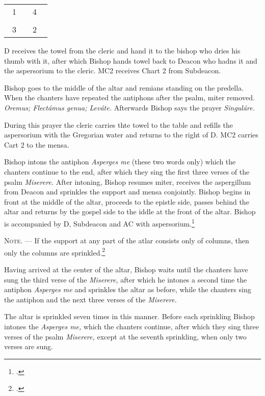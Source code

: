 \documentclass[letterpaper]{report}
\newcommand\crossplan{
\begin{center}
    \begin{tabular}{ | l c r | }
       \hline
        \cross\ {\small 1} &        & {\small 4} \cross\ \\
                           & \cross &           \\
        \cross\ {\small 3} &        & {\small 2} \cross\ \\
       \hline
   \end{tabular} 
\end{center}
}
\begin{document}
{\crossplan

D receives the towel from the cleric and hand it to the bishop who dries his
thumb with it, after which Bishop hands towel back to Deacon who hadns it and the
aspersorium to the cleric. MC2 receives Chart 2 from Subdeacon.

\rubric Bishop goes to the middle of the altar and remians standing on the predella.
When the chanters have repeated the antiphons after the psalm, miter removed.
\textit{Oremus; Flectámus genua; Leváte.} Afterwards Bishop says the prayer
\textit{Singuláre.}

During this prayer the cleric carries thte towel to the table and refills the
aspersorium with the Gregorian water and returns to the right of D. MC2 carries
Cart 2 to the mensa.

\rubric Bishop intons the antiphon \textit{Asperges me} (these two words only) which
the chanters continue to the end, after which they sing the first three verses
of the psalm \textit{Miserere.} After intoning, Bishop resumes miter, receives the
aspergillum from Deacon and sprinkles the support and mensa conjointly. Bishop begins in
front at the middle of the altar, proceeds to the epistle side, passes behind
the altar and returns by the gospel side to the iddle at the front of the
altar. Bishop is accompanied by D, Subdeacon and AC with aspersorium.\footcite[If the back
part of the altar is attached to the wall, so that the bishop cannot go around
it, he sprinkles only the \textit{base} of the base of the altar when passing
from the middle to the epistle corner, then the epistle side of the altar,
afterwards the table of the altar from the epistle corner to the gospel corner,
then the gospel side of the altar and finaly the \textit{base} in front of the
altar from the gospel corner to the middle.][footnote, p. 68.]{consecranda}

\textsc{Note. ---} If the support at any part of the atlar consists only of
columns, then only the columns are sprinkled.\footcite[][p. 68.]{consecranda}

\rubric Having arrived at the center of the altar, Bishop waits until the chanters
have sung the third verse of the \textit{Miserere,} after which he intones a
second time the antiphon \textit{Asperges me} and sprinkles the altar as
before, while the chanters sing the antiphon and the next three verses of the
\textit{Miserere.}

\rubric The altar is sprinkled seven times in this manner. Before each
sprinkling Bishop intones the \textit{Asperges me,} which the chanters continue,
after which they sing three verses of the psalm \textit{Miserere,} except at
the seventh sprinkling, when only two verses are sung.

}
\end{document}
